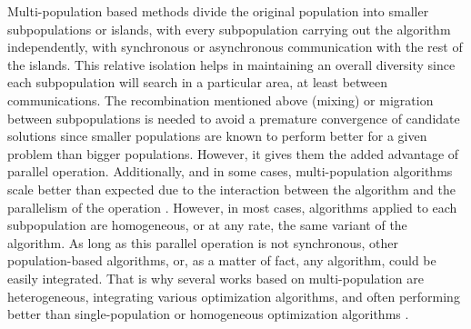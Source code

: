 \documentclass[runningheads]{llncs}
\begin{document}
Multi-population based methods divide the original population into
smaller subpopulations or islands, with every subpopulation carrying out the
algorithm independently, with synchronous or asynchronous communication with the
rest of the islands. This relative isolation helps in maintaining an overall
diversity since each subpopulation will search in a particular area, at least
between communications. The recombination mentioned above (mixing) or migration
between subpopulations is needed to avoid a premature convergence of candidate
solutions since smaller populations are known to perform better for a given
problem than bigger populations. However, it gives them the added advantage of
parallel operation. Additionally, and in some cases, multi-population algorithms
scale better than expected due to the interaction between the algorithm and the
parallelism of the operation \cite{ALBA20027}.
However, in most cases, algorithms applied to each subpopulation are
homogeneous, or at any rate, the same variant of the algorithm. As long as this
parallel operation is not synchronous, other population-based algorithms, or, as
a matter of fact, any algorithm, could be easily integrated. That is why several
works based on multi-population are heterogeneous, integrating various
optimization algorithms, and often performing better than single-population or
homogeneous optimization algorithms \cite{wu2016differential,nseef2016adaptive}.
\end{document}
